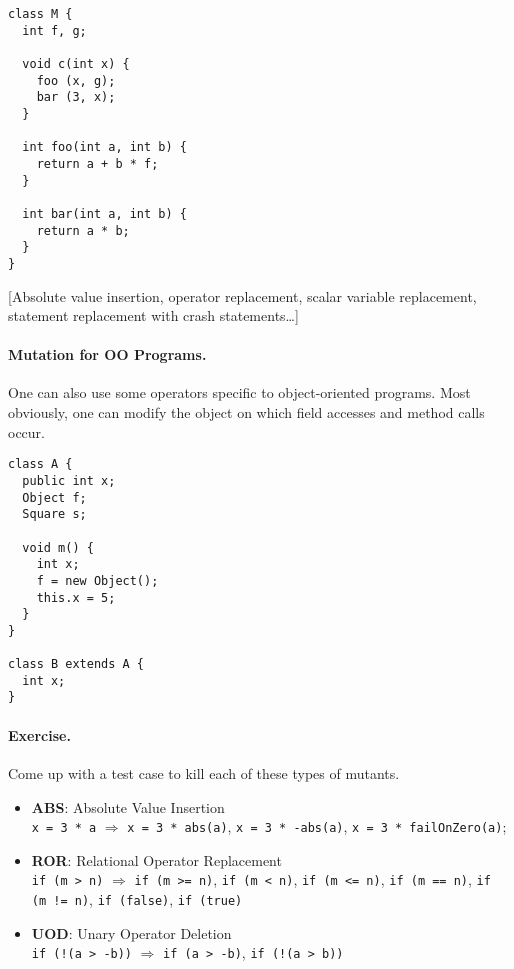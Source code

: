 \documentclass[11pt]{article}
\begin{document}
{
\begin{lstlisting}
class M {
  int f, g;

  void c(int x) {
    foo (x, g);
    bar (3, x);
  }

  int foo(int a, int b) {
    return a + b * f;
  }

  int bar(int a, int b) {
    return a * b;
  }
}
\end{lstlisting}
}

[Absolute value insertion, operator replacement, scalar variable replacement,
  statement replacement with crash statements\ldots]

\paragraph{Mutation for OO Programs.} One can also use some operators specific
to object-oriented programs. Most obviously, one can modify the object on
which field accesses and method calls occur.

{\small
\begin{lstlisting}
class A {
  public int x;
  Object f;
  Square s;

  void m() {
    int x;
    f = new Object();
    this.x = 5;
  }
}

class B extends A {
  int x;
}
\end{lstlisting}
}

\vspace*{-1em}
\paragraph{Exercise.} Come up with a test case to kill each of these types of
mutants.

\begin{itemize}
\item {\bf ABS}: Absolute Value Insertion\\
{\tt x = 3 * a}
$\Longrightarrow$ {\tt x = 3 * abs(a)}, {\tt x = 3 * -abs(a)}, {\tt x = 3 * failOnZero(a)};
\item {\bf ROR}: Relational Operator Replacement\\
{\tt if (m > n)} $\Longrightarrow$ {\tt if (m >= n)}, {\tt if (m < n)}, {\tt if (m <= n)}, {\tt if (m == n)}, {\tt if (m != n)}, {\tt if (false)}, {\tt if (true)}
\item {\bf UOD}: Unary Operator Deletion\\
{\tt if (!(a > -b))} $\Longrightarrow$ {\tt if (a > -b)}, {\tt if (!(a > b))}
\end{itemize}
\end{document}
